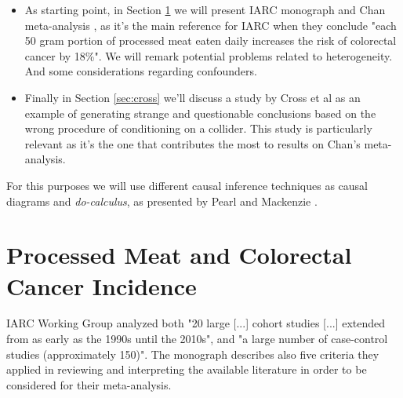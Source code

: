 \documentclass{article}
\begin{document}
\begin{itemize}

\item As starting point, in Section \ref{sec:iarc} we will present IARC monograph and Chan meta-analysis \cite{chan}, as it's the main reference for IARC when they conclude "each 50 gram portion of processed meat eaten daily increases the risk of colorectal cancer by 18\%". We will remark potential problems related to heterogeneity. And some considerations regarding confounders. %
\item Finally in Section \ref{sec:cross} we'll discuss a study by Cross et al \cite{cross} as an example of generating strange and questionable conclusions based on the wrong procedure of conditioning on a collider. This study is particularly relevant as it's the one that contributes the most to results on Chan's meta-analysis.%

\end{itemize}

For this purposes we will use different causal inference techniques as causal diagrams and \textit{do-calculus}, as presented by Pearl and Mackenzie \cite{bookofwhy}.

\section{Processed Meat and Colorectal Cancer Incidence}
\label{sec:iarc}

IARC Working Group analyzed both "20 large [...] cohort studies [...] extended from as early as the 1990s until the 2010s", and "a large number of case-control studies (approximately 150)".\cite{monograph} The monograph describes also five criteria they applied in reviewing and interpreting the available literature in order to be considered for their meta-analysis. %
\end{document}
